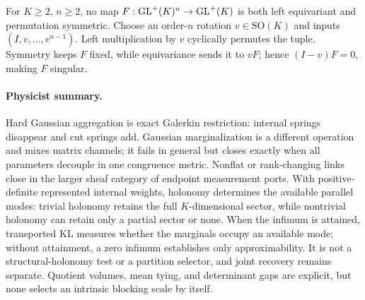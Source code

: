 For \(K\geq2\), \(n\geq2\), no map
\(F:\mathrm{GL}^+(K)^n\to\mathrm{GL}^+(K)\) is both left equivariant and permutation
symmetric. Choose an order-\(n\) rotation \(v\in\mathrm{SO}(K)\) and inputs
\((I,v,\ldots,v^{n-1})\). Left multiplication by \(v\) cyclically permutes
the tuple. Symmetry keeps \(F\) fixed, while equivariance sends it to \(vF\);
hence \((I-v)F=0\), making \(F\) singular. 

\paragraph{Physicist summary.}
Hard Gaussian aggregation is exact Galerkin restriction: internal springs
disappear and cut springs add. Gaussian marginalization is a different
operation and mixes matrix channels; it fails in general but closes exactly
when all parameters decouple in one congruence metric. Nonflat or
rank-changing links close in the larger sheaf category of endpoint
measurement ports. With positive-definite represented internal weights,
holonomy determines the available parallel modes: trivial holonomy retains
the full \(K\)-dimensional sector, while nontrivial holonomy can retain only a
partial sector or none. When the infimum is attained, transported KL measures
whether the marginals occupy an available mode; without attainment, a zero
infimum establishes only approximability. It is not a structural-holonomy
test or a partition selector, and joint recovery remains separate. Quotient
volumes, mean tying, and determinant gaps are explicit, but none selects an
intrinsic blocking scale by itself.
